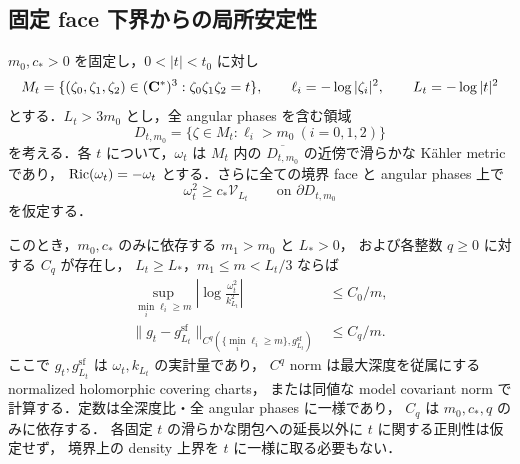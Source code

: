 \subsection{固定 face 下界からの局所安定性}

\begin{theorem}
\label{coarse:thm:boundary-to-triple}
$m_0,c_*>0$ を固定し，$0<|t|<t_0$ に対し
\[
 M_t=\{(\zeta_0,\zeta_1,\zeta_2)\in(\mathbf C^*)^3:
                  \zeta_0\zeta_1\zeta_2=t\},\qquad
 \ell_i=-\log|\zeta_i|^2,\qquad L_t=-\log|t|^2
\]
とする．$L_t>3m_0$ とし，全 angular phases を含む領域
\[
 D_{t,m_0}=\{\zeta\in M_t:\ell_i>m_0\ (i=0,1,2)\}
\]
を考える．各 $t$ について，$\omega_t$ は $M_t$ 内の
$\overline{D_{t,m_0}}$ の近傍で滑らかな Kähler metric であり，
$\operatorname{Ric}(\omega_t)=-\omega_t$ とする．さらに全ての境界 face と angular phases 上で
\begin{equation}\label{coarse:eq:local-triple-face-floor}
 \omega_t^2\ge c_*\mathcal V_{L_t}
 \qquad\text{on }\partial D_{t,m_0}
\end{equation}
を仮定する．

このとき，$m_0,c_*$ のみに依存する $m_1>m_0$ と $L_*>0$，
および各整数 $q\ge0$ に対する $C_q$ が存在し，
$L_t\ge L_*$，$m_1\le m<L_t/3$ ならば
\begin{align}
 \sup_{\min_i\ell_i\ge m}
   \left|\log\frac{\omega_t^2}{k_{L_t}^2}\right|
  &\le C_0/m,
       \label{coarse:eq:local-triple-small-volume}\\
 \|g_t-g_{L_t}^{\mathrm{sf}}\|_{C^q(\{\min_i\ell_i\ge m\},g_{L_t}^{\mathrm{sf}})}
  &\le C_q/m.
       \label{coarse:eq:local-triple-small-tensor}
\end{align}
ここで $g_t,g_{L_t}^{\mathrm{sf}}$ は $\omega_t,k_{L_t}$ の実計量であり，
$C^q$ norm は最大深度を従属にする normalized holomorphic covering charts，
または同値な model covariant norm で計算する．定数は全深度比・全 angular phases に一様であり，
$C_q$ は $m_0,c_*,q$ のみに依存する．
各固定 $t$ の滑らかな閉包への延長以外に $t$ に関する正則性は仮定せず，
境界上の density 上界を $t$ に一様に取る必要もない．
\end{theorem}

